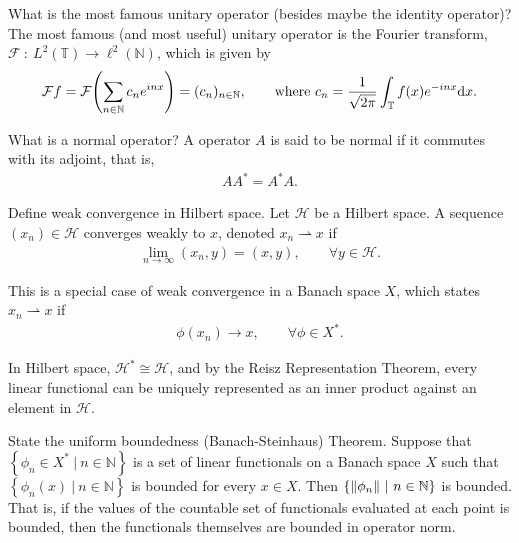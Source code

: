 \documentclass[avery5388,grid,frame]{flashcards}
\newcommand{\f}[3]{#1\ :\ #2 \rightarrow #3}
\def\hilb{\mathcal{H}}
\def\torus{\mathbb{T}}
\begin{document}
\begin{flashcard}
    {What is the most famous unitary operator (besides maybe the identity operator)?}
    The most famous (and most useful) unitary operator is the Fourier transform, $\f{\mathcal{F}}{L^2(\torus)}{\ell^2(\mathbb{N})}$, which is given by
    \begin{align*}
        \mathcal{F}f = \mathcal{F}\qty(\sum_{n\in\mathbb{N}}c_n e^{inx}) = (c_n)_{n\in\mathbb{N}}, \qquad \text{where } c_n = \frac{1}{\sqrt{2\pi}}\int_\torus f(x) e^{-inx}\dd x.
    \end{align*}
\end{flashcard}

\begin{flashcard}
    {What is a normal operator?}
    A operator $A$ is said to be normal if it commutes with its adjoint, that is,
    \begin{align*}
        AA^* = A^*A.
    \end{align*}
\end{flashcard}

\begin{flashcard}
    {Define weak convergence in Hilbert space.}
    Let $\hilb$ be a Hilbert space.  A sequence $(x_n) \in \hilb$ converges weakly to $x$, denoted $x_n \rightharpoonup x$ if
    \begin{align*}
        \lim_{n\rightarrow \infty} (x_n,y) = (x,y), \qquad \forall y \in \hilb.
    \end{align*}

    This is a special case of weak convergence in a Banach space $X$, which states $x_n \rightharpoonup x$ if
    \begin{align*}
        \phi(x_n) \rightarrow x, \qquad \forall \phi \in X^*.
    \end{align*}

    In Hilbert space, $\hilb^* \cong \hilb$, and by the Reisz Representation Theorem, every linear functional can be uniquely represented as an inner product against an element in $\hilb$.
\end{flashcard}

\begin{flashcard}
    {State the uniform boundedness (Banach-Steinhaus) Theorem.}
    Suppose that $\left\{\phi_n \in X^*\ |\ n \in \mathbb{N}\right\}$ is a set of linear functionals on a Banach space $X$ such that $\left\{\phi_n(x)\ |\ n \in \mathbb{N}\right\}$ is bounded for every $x \in X$.  Then $\left\{\norm{\phi_n}\ |\ n \in \mathbb{N}\right\}$ is bounded. \\

    That is, if the values of the countable set of functionals evaluated at each point is bounded, then the functionals themselves are bounded in operator norm.
\end{flashcard}
\end{document}
